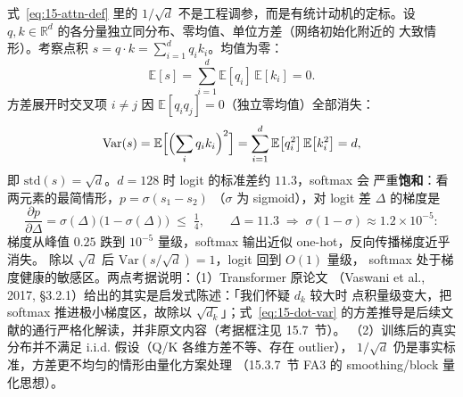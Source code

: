 式~\ref{eq:15-attn-def} 里的 $1/\sqrt{d}$ 不是工程调参，而是有统计动机的定标。设
$q, k \in \mathbb{R}^{d}$ 的各分量独立同分布、零均值、单位方差（网络初始化附近的
大致情形）。考察点积
$s = q \cdot k = \sum_{i=1}^{d} q_i k_i$。均值为零：
\begin{equation}
  \mathbb{E}[s] = \sum_{i=1}^{d} \mathbb{E}[q_i]\,\mathbb{E}[k_i] = 0 .
\end{equation}
方差展开时交叉项 $i \ne j$ 因 $\mathbb{E}[q_i q_j] = 0$（独立零均值）全部消失：
\begin{equation}
  \mathrm{Var}(s) = \mathbb{E}\Bigl[\Bigl(\sum_i q_i k_i\Bigr)^{2}\Bigr]
  = \sum_{i=1}^{d} \mathbb{E}\bigl[q_i^{2}\bigr]\,\mathbb{E}\bigl[k_i^{2}\bigr]
  = d ,
  \label{eq:15-dot-var}
\end{equation}
即 $\mathrm{std}(s) = \sqrt{d}$。$d = 128$ 时 logit 的标准差约 $11.3$，softmax 会
严重\textbf{饱和}：看两元素的最简情形，$p = \sigma(s_1 - s_2)$
（$\sigma$ 为 sigmoid），对 logit 差 $\Delta$ 的梯度是
\begin{equation}
  \frac{\partial p}{\partial \Delta} = \sigma(\Delta)\bigl(1 - \sigma(\Delta)\bigr)
  \;\le\; \tfrac{1}{4},
  \qquad
  \Delta = 11.3 \;\Rightarrow\; \sigma(1-\sigma) \approx 1.2 \times 10^{-5} :
  \label{eq:15-sat}
\end{equation}
梯度从峰值 $0.25$ 跌到 $10^{-5}$ 量级，softmax 输出近似 one-hot，反向传播梯度近乎消失。
除以 $\sqrt{d}$ 后 $\mathrm{Var}(s/\sqrt{d}) = 1$，logit 回到 $O(1)$ 量级，
softmax 处于梯度健康的敏感区。两点考据说明：（1）Transformer 原论文
（Vaswani et al., 2017, \S 3.2.1）给出的其实是启发式陈述：「我们怀疑 $d_k$ 较大时
点积量级变大，把 softmax 推进极小梯度区，故除以 $\sqrt{d_k}$」；式~\ref{eq:15-dot-var}
的方差推导是后续文献的通行严格化解读，并非原文内容（考据框注见 15.7~节）。
（2）训练后的真实分布并不满足 i.i.d. 假设（Q/K 各维方差不等、存在 outlier），
$1/\sqrt{d}$ 仍是事实标准，方差更不均匀的情形由量化方案处理
（15.3.7~节 FA3 的 smoothing/block 量化思想）。

